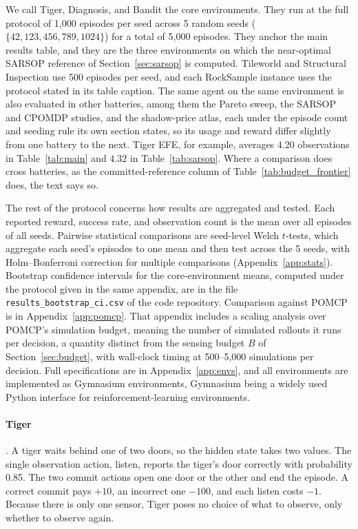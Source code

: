 We call Tiger, Diagnosis, and Bandit the core environments. They run at the full protocol of 1{,}000 episodes per seed across 5 random seeds ($\{42, 123, 456, 789, 1024\}$) for a total of 5{,}000 episodes. They anchor the main results table, and they are the three environments on which the near-optimal SARSOP reference of Section~\ref{sec:sarsop} is computed. Tileworld and Structural Inspection use 500 episodes per seed, and each RockSample instance uses the protocol stated in its table caption. The same agent on the same environment is also evaluated in other batteries, among them the Pareto sweep, the SARSOP and CPOMDP studies, and the shadow-price atlas, each under the episode count and seeding rule its own section states, so its usage and reward differ slightly from one battery to the next. Tiger EFE, for example, averages $4.20$ observations in Table~\ref{tab:main} and $4.32$ in Table~\ref{tab:sarsop}. Where a comparison does cross batteries, as the committed-reference column of Table~\ref{tab:budget_frontier} does, the text says so.

The rest of the protocol concerns how results are aggregated and tested. Each reported reward, success rate, and observation count is the mean over all episodes of all seeds. Pairwise statistical comparisons are seed-level Welch $t$-tests, which aggregate each seed's episodes to one mean and then test across the 5 seeds, with Holm--Bonferroni correction for multiple comparisons (Appendix~\ref{app:stats}). Bootstrap confidence intervals for the core-environment means, computed under the protocol given in the same appendix, are in the file \texttt{results\_\allowbreak bootstrap\_\allowbreak ci.csv} of the code repository. Comparison against POMCP is in Appendix~\ref{app:pomcp}. That appendix includes a scaling analysis over POMCP's simulation budget, meaning the number of simulated rollouts it runs per decision, a quantity distinct from the sensing budget $B$ of Section~\ref{sec:budget}, with wall-clock timing at 500--5{,}000 simulations per decision. Full specifications are in Appendix~\ref{app:envs}, and all environments are implemented as Gymnasium \citep{towers2024} environments, Gymnasium being a widely used Python interface for reinforcement-learning environments.

\paragraph{Tiger} \citep{kaelbling1998}. A tiger waits behind one of two doors, so the hidden state takes two values. The single observation action, listen, reports the tiger's door correctly with probability 0.85. The two commit actions open one door or the other and end the episode. A correct commit pays $+10$, an incorrect one $-100$, and each listen costs $-1$. Because there is only one sensor, Tiger poses no choice of what to observe, only whether to observe again.

